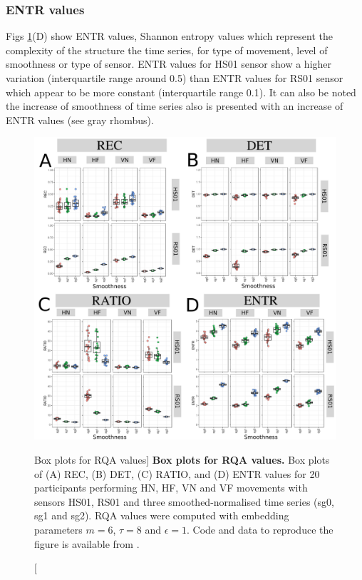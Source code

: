 \documentclass[fleqn,10pt]{wlscirep}
\begin{document}
\subsubsection*{ENTR values}
Figs \ref{fig:RQABP}(D) show ENTR values, Shannon entropy values 
which represent the complexity of 
the structure the time series, 
for type of movement, level of smoothness or type of sensor.
ENTR values for HS01 sensor show a higher variation  
(interquartile range around 0.5)
than ENTR values for RS01 sensor which appear 
to be more constant (interquartile range 0.1).
It can also be noted the increase of smoothness of time series 
also is presented with an increase of ENTR values (see gray rhombus).


\begin{figure}
\centering
\includegraphics[width=1.0\textwidth]{figures/rqa/pdf/rqa-bp}
    \caption
	[Box plots for RQA values]{
	{\bf Box plots for RQA values.}
	Box plots of (A) REC, (B) DET, (C) RATIO, and (D) ENTR values 
	for 20 participants performing HN, HF, VN and VF movements
	with sensors HS01, RS01 and three smoothed-normalised  
	time series (sg0, sg1 and sg2).
	RQA values were computed with 
	embedding parameters $m=6$, $\tau=8$ and $\epsilon=1$.
	Code and data to reproduce the figure is available from \cite{srep2019}.
        }
    \label{fig:RQABP}
\end{figure}
\end{document}

